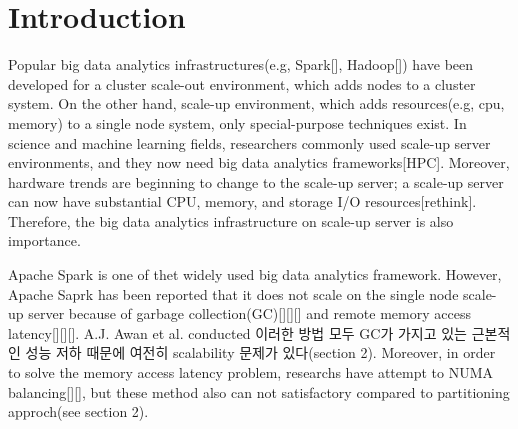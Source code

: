 \section{Introduction} \label{sec:introduction}
Popular big data analytics infrastructures(e.g, Spark[], Hadoop[]) have been
developed for a cluster scale-out environment, which adds nodes to a
cluster system.
On the other hand, scale-up environment, which adds resources(e.g, cpu, memory)
to a single node system, only special-purpose techniques exist.
In science and machine learning fields, researchers
commonly used scale-up server environments, and they now need big data analytics
frameworks[HPC].
Moreover, hardware trends are beginning to change to the scale-up
server; a scale-up server can now have substantial CPU, memory,
and storage I/O resources[rethink].
Therefore, the big data analytics infrastructure on scale-up server is
also importance.

\ifkor
Apache Spark is one of thet widely used big data analytics framework.
However, Apache Saprk has been reported that it does
not scale on the single node scale-up server because of garbage
collection(GC)[][][] and remote memory access latency[][][]. 
A.J. Awan et al. conducted 
이러한 방법 모두 GC가 가지고 있는 근본적인 성능 저하 때문에 여전히 
scalability 문제가 있다(section 2). 
Moreover, in order to solve the memory access latency problem, researchs have
attempt to NUMA balancing[][], but these method also can not satisfactory
compared to partitioning approch(see section 2).
\else


